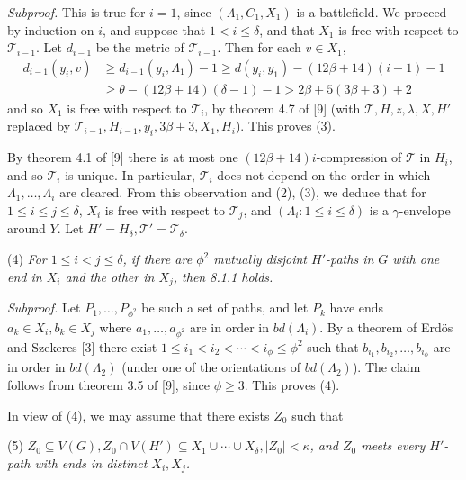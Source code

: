 \textit{Subproof.} This is true for $i = 1$, since $(\Lambda_1, C_1, X_1)$ is a battlefield. We proceed by induction on $i$, and suppose that $1 < i \le \delta$, and that $X_1$ is free with respect to $\mathscr{T}_{i-1}$. Let $d_{i-1}$ be the metric of $\mathscr{T}_{i-1}$. Then for each $v \in X_1$,
\begin{align*}
d_{i-1}(y_i, v) &\ge d_{i-1}(y_i, \Lambda_1) - 1 \ge d(y_i, y_1) - (12\beta + 14)(i - 1) - 1 \\
&\ge \theta - (12\beta + 14)(\delta - 1) - 1 > 2\beta + 5(3\beta + 3) + 2
\end{align*}
and so $X_1$ is free with respect to $\mathscr{T}_i$, by theorem 4.7 of [9] (with $\mathscr{T}, H, z, \lambda, X, H'$ replaced by $\mathscr{T}_{i-1}, H_{i-1}, y_i, 3\beta + 3, X_1, H_i$). This proves (3).

By theorem 4.1 of [9] there is at most one $(12\beta + 14)i$-compression of $\mathscr{T}$ in $H_i$, and so $\mathscr{T}_i$ is unique. In particular, $\mathscr{T}_i$ does not depend on the order in which $\Lambda_1, \ldots, \Lambda_i$ are cleared. From this observation and (2), (3), we deduce that for $1 \le i \le j \le \delta$, $X_i$ is free with respect to $\mathscr{T}_j$, and $(\Lambda_i \colon 1 \le i \le \delta)$ is a $\gamma$-envelope around $Y$. Let $H' = H_\delta, \mathscr{T}' = \mathscr{T}_\delta$.

\hspace*{12pt}(4) \textit{For $1 \le i < j \le \delta$, if there are $\phi^2$ mutually disjoint $H'$-paths in $G$ with one end in $X_i$ and the other in $X_j$, then 8.1.1 holds.}

\textit{Subproof.} Let $P_1, \ldots, P_{\phi^2}$ be such a set of paths, and let $P_k$ have ends $a_k \in X_i, b_k \in X_j$ where $a_1, \ldots, a_{\phi^2}$ are in order in $bd(\Lambda_i)$. By a theorem of Erd\"os and Szekeres [3] there exist $1 \le i_1 < i_2 < \cdots < i_\phi \le \phi^2$ such that $b_{i_1}, b_{i_2}, \ldots, b_{i_\phi}$ are in order in $bd(\Lambda_2)$ (under one of the orientations of $bd(\Lambda_2)$). The claim follows from theorem 3.5 of [9], since $\phi \ge 3$. This proves (4).

In view of (4), we may assume that there exists $Z_0$ such that

\hspace*{12pt}(5) \textit{$Z_0 \subseteq V(G), Z_0 \cap V(H') \subseteq X_1 \cup \cdots \cup X_\delta, |Z_0| < \kappa$, and $Z_0$ meets every $H'$-path with ends in distinct $X_i, X_j$.}

